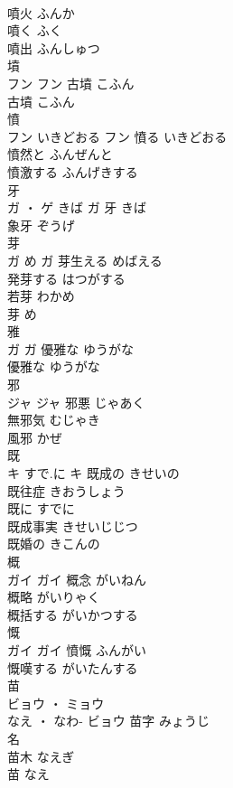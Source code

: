 \documentclass[8pt]{extreport}
\begin{document}
\begin{CJK}{UTF8}{min}
\\	噴火	ふんか	
\\	噴く	ふく	
\\	噴出	ふんしゅつ	
\\	墳	
\\	フン		フン	古墳	こふん	
\\	古墳	こふん	
\\	憤	
\\	フン	いきどおる	フン	憤る	いきどおる	
\\	憤然と	ふんぜんと	
\\	憤激する	ふんげきする	
\\	牙	
\\	ガ ・ ゲ	きば	ガ													牙	きば	
\\	象牙	ぞうげ	
\\	芽	
\\	ガ	め	ガ	芽生える	めばえる	
\\	発芽する	はつがする	
\\	若芽	わかめ	
\\	芽	め	
\\	雅	
\\	ガ		ガ	優雅な	ゆうがな	
\\	優雅な	ゆうがな	
\\	邪	
\\	ジャ		ジャ	邪悪	じゃあく	
\\	無邪気	むじゃき	
\\	風邪	かぜ	
\\	既	
\\	キ	すで.に	キ	既成の	きせいの	
\\	既往症	きおうしょう	
\\	既に	すでに	
\\	既成事実	きせいじじつ	
\\	既婚の	きこんの	
\\	概	
\\	ガイ		ガイ	概念	がいねん	
\\	概略	がいりゃく	
\\	概括する	がいかつする	
\\	慨	
\\	ガイ		ガイ	憤慨	ふんがい	
\\	慨嘆する	がいたんする	
\\	苗	
\\	ビョウ ・ ミョウ
\\	なえ ・ なわ-	ビョウ	苗字	みょうじ	
\\	名 
\\	苗木	なえぎ	
\\	苗	なえ	

\end{CJK}
\end{document}
